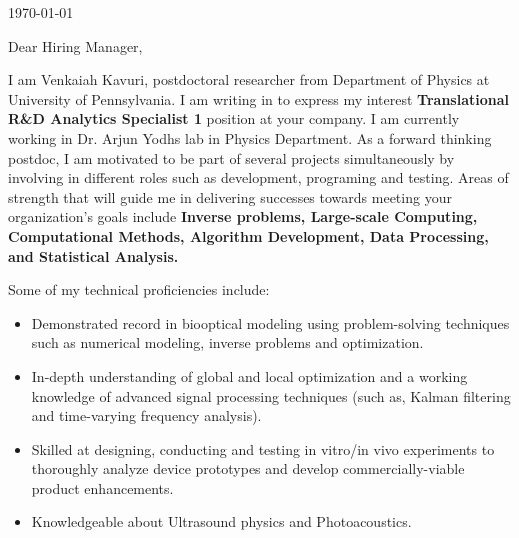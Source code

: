 \documentclass{my_cv}
\begin{document}
\vspace{-2mm}
\begin{center} 
\begin{footnotesize}
\end{footnotesize}

\href{https://www.linkedin.com/in/venkaiahchowdarykavuri}{\faLinkedinSquare} \href{https://github.com/Venki-Kavuri}{\faGithub} \href{https://scholar.google.com/citations?hl=en&user=r5E9ACIAAAAJ&view_op=list_works}{\aiGoogleScholar} \href{https://www.facebook.com/venki.kavuri}{\faFacebookOfficial}
\end{center} 
\vspace{5mm} 
\today\\
\vspace{5mm} 



Dear Hiring Manager,\\
\vspace{2mm} 

I am Venkaiah Kavuri, postdoctoral researcher from Department of Physics at University of Pennsylvania. I am writing in to express my interest \textbf{Translational R\&D Analytics Specialist 1} position at your company. I am currently working in Dr. Arjun Yodh\textquotesingle s lab in Physics Department. As a forward thinking postdoc, I am motivated to be part of several projects simultaneously by involving in different roles such as development, programing and testing. Areas of strength that will guide me in delivering successes towards meeting your organization's goals include \textbf{Inverse problems, Large-scale Computing, Computational Methods, Algorithm Development, Data Processing, and Statistical Analysis.}\\
\vspace{2mm} 


Some of my technical proficiencies include:\\
\begin{itemize}\itemsep -2pt
\item Demonstrated record in biooptical modeling using problem-solving techniques such as numerical modeling, inverse problems and optimization.\\
\item In-depth understanding of global and local optimization and a working knowledge of advanced signal processing techniques (such as, Kalman filtering and time-varying frequency analysis).\\
\item Skilled at designing, conducting and testing in vitro/in vivo experiments to thoroughly analyze device prototypes and develop commercially-viable product enhancements.\\
\item Knowledgeable about Ultrasound physics and Photoacoustics.\\
\end{itemize} 
\end{document}

